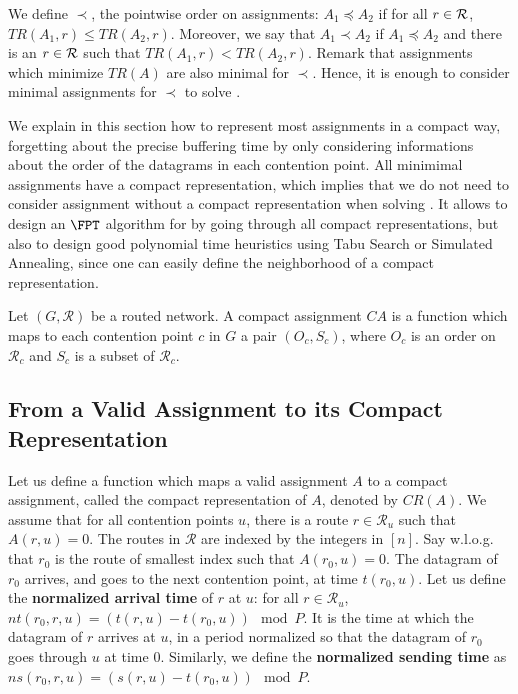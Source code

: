  We define $\prec$, the pointwise order on assignments: $A_1 \preceq A_2$ if for all $r\in {\cal R}$, $TR(A_1,r) \leq TR(A_2,r)$. Moreover, we say that $A_1 \prec A_2$ if $A_1 \preceq A_2$ and there is an $r \in \cal {R}$ such that  $TR(A_1,r) < TR(A_2,r)$. Remark that assignments which minimize $TR(A)$ are also minimal for $\prec$. Hence, it is enough to consider minimal assignments for $\prec$ to solve \spall.

We explain in this section how to represent most assignments in a compact way, forgetting about the precise buffering time by only considering informations about the order of the datagrams in each contention point. All minimimal assignments have a compact representation, which implies that we do not need to consider assignment without a compact representation when solving \spall. 
It allows to design an $\FPT$ algorithm for \spall by going through all compact representations, but also to design good polynomial time heuristics using Tabu Search or Simulated Annealing, since one can easily define the neighborhood of a compact representation.


\begin{definition}
Let $(G, \mathcal{R})$ be a routed network. A compact assignment $CA$ is a function which maps to each contention point $c$ in $G$ a pair $(O_c,S_c)$, where $O_c$ is an order on $\mathcal{R}_c$ and $S_c$ is a subset of $\mathcal{R}_c$.
\label{definition:compact}
\end{definition}


\subsection{From a Valid Assignment to its Compact Representation}

Let us define a function which maps a valid assignment $A$ to a compact assignment, called the compact representation of $A$, denoted by $CR(A)$. We assume that for all contention points $u$, there is a route $r \in \mathcal{R}_u$ such that $A(r,u) = 0$. The routes in $\mathcal{R}$ are indexed by the integers in $[n]$. Say w.l.o.g. that $r_0$ is the route of smallest index such that $A(r_0,u) = 0$. The datagram of $r_0$ arrives, and goes to the next contention point, at time $t(r_0,u)$. Let us define the \textbf{normalized arrival time} of $r$ at $u$: for all $r \in \mathcal{R}_u$, $nt(r_0,r,u) = (t(r,u) - t(r_0,u)) \mod P$. It is the time at which the datagram of $r$ arrives at $u$, in a period normalized so that the datagram of $r_0$ goes through $u$ at time $0$. Similarly, we define the \textbf{normalized sending time} as $ns(r_0,r,u) = (s(r,u) - t(r_0,u)) \mod P$.

